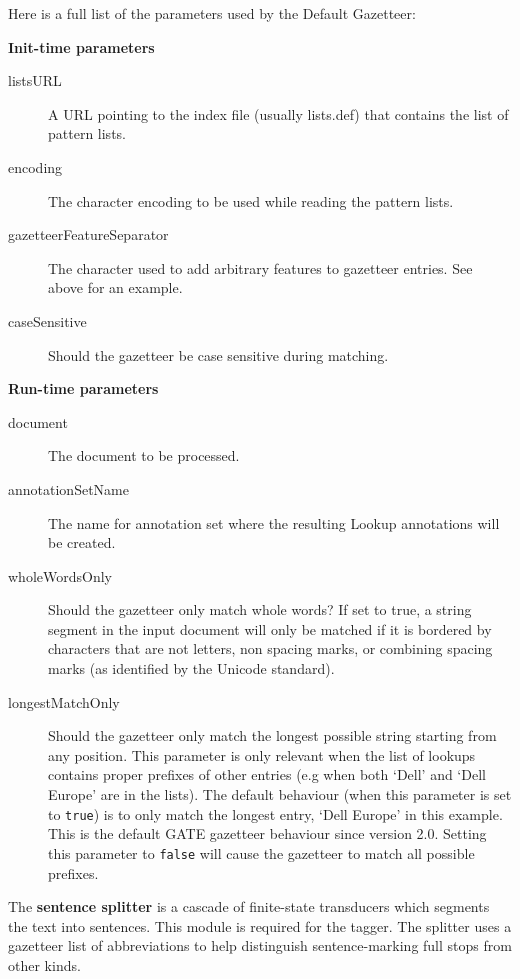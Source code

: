 Here is a full list of the parameters used by the Default Gazetteer:

{\bf Init-time parameters}
\begin{description}
\item[listsURL] A URL pointing to the index file (usually lists.def) that 
contains the list of pattern lists. 
\item[encoding] The character encoding to be used while reading the pattern 
lists.
\item[gazetteerFeatureSeparator] The character used to add arbitrary features 
to gazetteer entries. See above for an example.
\item[caseSensitive] Should the gazetteer be case sensitive during matching.
\end{description}

{\bf Run-time parameters}
\begin{description}
\item[document] The document to be processed.
\item[annotationSetName] The name for annotation set where the resulting Lookup 
annotations will be created.
\item[wholeWordsOnly] Should the gazetteer only match whole words? If set to 
true, a string segment in the input document will only be matched if it is 
bordered by characters that are not letters, non spacing marks, or combining 
spacing marks (as identified by the Unicode standard).
\item[longestMatchOnly] Should the gazetteer only match the longest possible
string starting from any position. This parameter is only relevant when the 
list of lookups contains proper prefixes of other entries (e.g when both `Dell'
and `Dell Europe' are in the lists). The default behaviour (when this parameter
is set to {\tt true}) is to only match the longest entry, `Dell Europe' in this 
example. This is the default GATE gazetteer behaviour since version 2.0. Setting
this parameter to {\tt false} will cause the gazetteer to match all possible prefixes.
\end{description}

The \textbf{sentence splitter} is a cascade of finite-state transducers which
segments the text into sentences. This module is required for the
tagger. The splitter uses a gazetteer list of abbreviations to help
distinguish sentence-marking full stops from other kinds.

